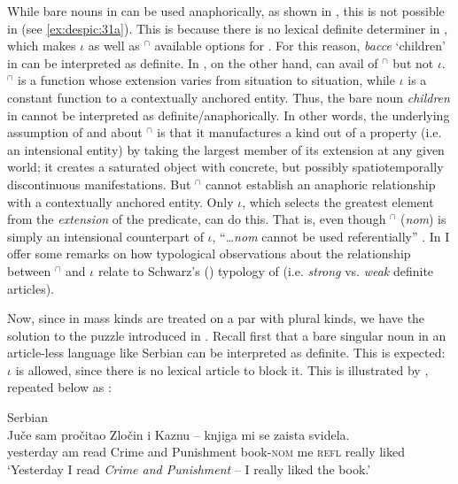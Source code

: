 \documentclass[output=paper,
modfonts
]{langscibook}
\begin{document}
	While bare nouns in  can be used anaphorically, as shown in , this is not possible in  (see \ref{ex:despic:31a}). This is because there is no lexical definite determiner in , which makes $\iota$ as well as $^\cap$ available options for . For this reason, \textit{bacce} `children' in  can be interpreted as definite. In , on the other hand,  can avail of $^\cap$ but not $\iota$. $^\cap$ is a function whose extension varies from situation to situation, while $\iota$ is a constant function to a
	contextually anchored entity. Thus, the bare noun \textit{children} in  cannot be interpreted as definite/anaphorically.
	In other words, the underlying assumption of \citet{Chierchia1998} and \citet{Dayal2004} about $^\cap$ is that it manufactures a kind out of a property (i.e. an intensional entity) by taking the largest member of its extension at any given world; it creates a saturated object with concrete, but possibly spatiotemporally discontinuous manifestations. But $^\cap$ cannot establish an anaphoric relationship with a contextually anchored entity. Only $\iota$, which selects the greatest element from the \textit{extension} of the predicate, can do this. That is, even though $^\cap$ (\textit{nom}) is simply an intensional counterpart of $\iota$, ``\ldots \textit{nom} cannot be used referentially'' \citep[1103]{Dayal2011}. In  I offer some remarks on how  typological observations about the relationship between $^\cap$ and $\iota$ relate to Schwarz's (\citeyear{Schwarz2009,Schwarz2013}) typology of  (i.e. \textit{strong} vs. \textit{weak} definite articles). 
	
	Now, since in \citet{Dayal2004} mass kinds are treated on a par with plural kinds, we have the solution to the puzzle introduced in . Recall first that a bare singular noun in an article-less language like Serbian can be interpreted as definite. This is expected: $\iota$ is allowed, since there is no lexical article to block it. This is illustrated by , repeated below as :
	
	\ea \label{ex:despic:32}
	Serbian \\
	\gll 
	{Ju\v ce} {sam} {pro\v citao} {{Zlo\v cin i Kaznu}} {--} {knjiga} {mi} {se} {zaista} {svidela.} \\
	yesterday am read {Crime and Punishment} {} book-\textsc{nom} me \textsc{refl} really liked \\ 
	\glt `Yesterday I read \textit{Crime and Punishment} -- I really liked the book.'
	\z 
	
\end{document}
